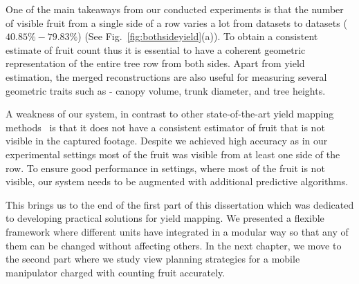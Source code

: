 One of the main takeaways from our conducted experiments is that the number of visible fruit from a single side of a row varies a lot from datasets to datasets ($40.85\% - 79.83\%$) (See Fig.~\ref{fig:bothsideyield}(a)). To obtain a consistent estimate of fruit count thus it is essential to have a coherent geometric representation of the entire tree row from both sides. Apart from yield estimation, the merged reconstructions are also useful for measuring several geometric traits such as - canopy volume, trunk diameter, and tree heights.

A weakness of our system, in contrast to other state-of-the-art yield mapping methods~\cite{wang,sa_deepfruits:_2016,bargoti_deep_2017,stein_image_2016} is that it does not have a consistent estimator of fruit that is not visible in the captured footage. Despite we achieved high accuracy as in our experimental settings most of the fruit was visible from at least one side of the row. To ensure good performance in settings, where most of the fruit is not visible, our system needs to be augmented with additional predictive algorithms.


This brings us to the end of the first part of this dissertation which was dedicated to developing practical solutions for yield mapping. We presented a flexible framework where different units have integrated in a modular way so that any of them can be changed without affecting others. In the next chapter, we move to the second part where we study view planning strategies for a mobile manipulator charged with counting fruit accurately.   

